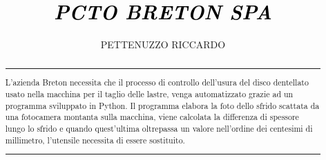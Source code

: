 \documentclass[a4paper, notitlepage, 12pt]{article}
\title{\textcolor{black}{\emph{PCTO BRETON SPA}}}
\author{PETTENUZZO RICCARDO}%
\date{}
\begin{document}
    \normalsize
    \maketitle
    \begin{abstract}
        \noindent \rule{\linewidth}{.6pt}\par
        \noindent L'azienda Breton necessita che il processo di controllo dell'usura del disco dentellato usato nella
        macchina per il taglio delle lastre, venga automatizzato grazie ad un programma sviluppato in Python.
        Il programma elabora la foto dello sfrido scattata da una fotocamera montanta sulla macchina, viene calcolata
        la differenza di spessore lungo lo sfrido e quando quest'ultima oltrepassa un valore nell'ordine dei centesimi 
        di millimetro, l'utensile necessita di essere sostituito.
        \par
        \noindent \rule{\linewidth}{.6pt}  
    \end{abstract}
\end{document}
